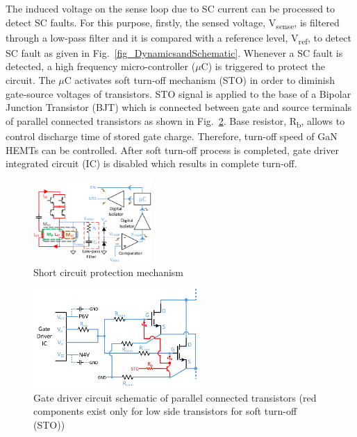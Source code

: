 \documentclass[journal]{IEEEtran}
\begin{document}
The induced voltage on the sense loop due to SC current can be processed to detect SC faults. For this purpose, firstly, the sensed voltage, V\textsubscript{sense}, is filtered through a low-pass filter and it is compared with a reference level, V\textsubscript{ref}, to detect SC fault as given in Fig.~\ref{fig_DynamicsandSchematic}. Whenever a SC fault is detected, a high frequency micro-controller ($\mu$C) is triggered to protect the circuit. The $\mu$C activates soft turn-off mechanism (STO) in order to diminish gate-source voltages of transistors. STO signal is applied to the base of a Bipolar Junction Transistor (BJT) which is connected between gate and source terminals of parallel connected transistors as shown in Fig.~\ref{fig_gdcircuit}. Base resistor, R\textsubscript{b}, allows to control discharge time of stored gate charge. Therefore, turn-off speed of GaN HEMTs can be controlled. After soft turn-off process is completed, gate driver integrated circuit (IC) is disabled which results in complete turn-off.

\begin{figure}[!t]
\centering
\includegraphics[width=0.4\textwidth]{Figures/Fig2-SignalProcessingBlock - v2.pdf}
\caption{Short circuit protection mechanism}
\label{fig_scmech}
\end{figure}

\begin{figure}[!t]
\centering
\includegraphics[width=2.5in]{Figures/Fig3-GateDriver.pdf}
\caption{Gate driver circuit schematic of parallel connected transistors (red components exist only for low side transistors for soft turn-off (STO))}
\label{fig_gdcircuit}
\end{figure}
\end{document}
